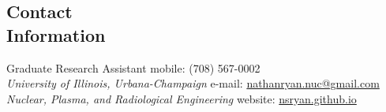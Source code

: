 \documentclass[margin,line]{resume}
\begin{document}
\begin{resume}

%


    \section{\mysidestyle Contact\\Information}
    Graduate Research Assistant \hfill mobile: (708) 567-0002 \vspace{0mm}\\\vspace{0mm}%
        \textsl{University of Illinois, Urbana-Champaign}
        \hfill e-mail: \href{mailto:nathanryan.nuc@gmail.com}{nathanryan.nuc@gmail.com}       \vspace{0mm}\\\vspace{0mm}%
    \textsl{Nuclear, Plasma, and Radiological Engineering}
        \hfill website: \href{https://nsryan.github.io}{nsryan.github.io}     \vspace{0mm}\\\vspace{0mm}%


\end{resume}
\end{document}
